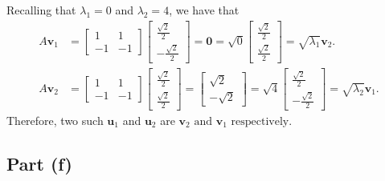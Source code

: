 \documentclass[11pt]{article}
\renewcommand{\vec}[1]{\mathbf{#1}}
\begin{document}
Recalling that $\lambda_{1} = 0$ and $\lambda_{2} = 4$, we have that
\begin{align*}
	A \vec{v}_{1} &= \begin{bmatrix} 1 & 1 \\ -1 & -1 \end{bmatrix} \begin{bmatrix} \tfrac{\sqrt{2}}{2} \\ -\tfrac{\sqrt{2}}{2} \end{bmatrix} = \vec{0} = \sqrt{0} \begin{bmatrix} \tfrac{\sqrt{2}}{2} \\ \tfrac{\sqrt{2}}{2} \end{bmatrix} = \sqrt{\lambda_{1}} \vec{v}_{2}. \\
	A \vec{v}_{2} &= \begin{bmatrix} 1 & 1 \\ -1 & -1 \end{bmatrix} \begin{bmatrix} \tfrac{\sqrt{2}}{2} \\ \tfrac{\sqrt{2}}{2} \end{bmatrix} = \begin{bmatrix} \sqrt{2} \\ -\sqrt{2} \end{bmatrix} = \sqrt{4} \begin{bmatrix} \tfrac{\sqrt{2}}{2} \\ -\tfrac{\sqrt{2}}{2} \end{bmatrix} = \sqrt{\lambda_{2}} \vec{v}_{1}.
\end{align*}
Therefore, two such $\vec{u}_{1}$ and $\vec{u}_{2}$ are $\boxed{\text{$\vec{v}_{2}$ and $\vec{v}_{1}$ respectively}}$.


\subsection{Part (f)}
\end{document}
